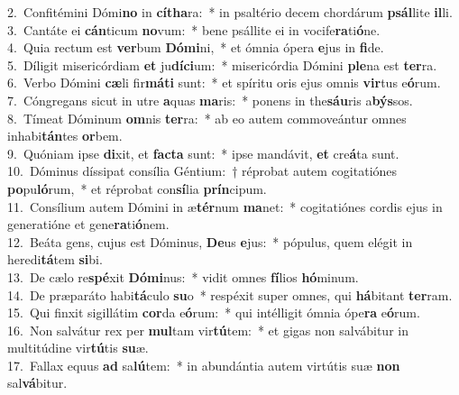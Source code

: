 {2.~}Confitémini Dómi\textbf{no} in \textbf{cí}\textbf{tha}ra:~* in psaltério decem chordárum \textbf{psál}lite \textbf{il}li.\\
{3.~}Cantáte ei \textbf{cán}ticum \textbf{no}vum:~* bene psállite ei in vocife\textbf{ra}ti\textbf{ó}ne.\\
{4.~}Quia rectum est \textbf{ver}bum \textbf{Dó}\textbf{mi}ni,~* et ómnia ópera \textbf{e}jus in \textbf{fi}de.\\
{5.~}Díligit misericórdiam \textbf{et} ju\textbf{dí}\textbf{ci}um:~* misericórdia Dómini \textbf{ple}na est \textbf{ter}ra.\\
{6.~}Verbo Dómini \textbf{cæ}li fir\textbf{má}\textbf{ti} sunt:~* et spíritu oris ejus omnis \textbf{vir}tus e\textbf{ó}rum.\\
{7.~}Cóngregans sicut in utre \textbf{a}quas \textbf{ma}ris:~* ponens in the\textbf{sáu}ris a\textbf{býs}sos.\\
{8.~}Tímeat Dóminum \textbf{om}nis \textbf{ter}ra:~* ab eo autem commoveántur omnes inhabi\textbf{tán}tes \textbf{or}bem.\\
{9.~}Quóniam ipse \textbf{di}xit, et \textbf{fa}\textbf{cta} sunt:~* ipse mandávit, \textbf{et} cre\textbf{á}ta sunt.\\
{10.~}Dóminus díssipat consília Géntium:~† réprobat autem cogitatiónes \textbf{po}pu\textbf{ló}rum,~* et réprobat con\textbf{sí}lia \textbf{prín}cipum.\\
{11.~}Consílium autem Dómini in æ\textbf{tér}num \textbf{ma}net:~* cogitatiónes cordis ejus in generatióne et gene\textbf{ra}ti\textbf{ó}nem.\\
{12.~}Beáta gens, cujus est Dóminus, \textbf{De}us \textbf{e}jus:~* pópulus, quem elégit in heredi\textbf{tá}tem \textbf{si}bi.\\
{13.~}De cælo re\textbf{spé}xit \textbf{Dó}\textbf{mi}nus:~* vidit omnes \textbf{fí}lios \textbf{hó}minum.\\
{14.~}De præparáto habi\textbf{tá}culo \textbf{su}o~* respéxit super omnes, qui \textbf{há}bitant \textbf{ter}ram.\\
{15.~}Qui finxit sigillátim \textbf{cor}da e\textbf{ó}rum:~* qui intélligit ómnia ópe\textbf{ra} e\textbf{ó}rum.\\
{16.~}Non salvátur rex per \textbf{mul}tam vir\textbf{tú}tem:~* et gigas non salvábitur in multitúdine vir\textbf{tú}tis \textbf{su}æ.\\
{17.~}Fallax equus \textbf{ad} sa\textbf{lú}tem:~* in abundántia autem virtútis suæ \textbf{non} sal\textbf{vá}bitur.\\
